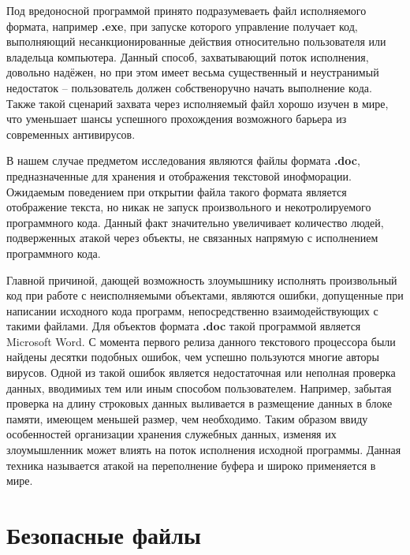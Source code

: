 Под вредоносной программой принято подразумеваеть файл исполняемого формата, например \textbf{.exe}, при запуске которого управление получает код, выполняющий несанкционированные действия относительно пользователя или владельца компьютера. 
Данный способ, захватывающий поток исполнения, довольно надёжен, но при этом имеет весьма существенный и неустранимый недостаток -- пользователь должен собственоручно начать выполнение кода.
Также такой сценарий захвата через исполняемый файл хорошо изучен в мире, что уменьшает шансы успешного прохождения возможного барьера из современных антивирусов.

В нашем случае предметом исследования являются файлы формата \textbf{.doc}, предназначенные для хранения и отображения текстовой инофморации. 
Ожидаемым поведением при открытии файла такого формата является отображение текста, но никак не запуск произвольного и некотролируемого программного кода.
Данный факт значительно увеличивает количество людей, подверженных атакой через объекты, не связанных напрямую с исполнением программного кода.

Главной причиной, дающей возможность злоумышнику исполнять произвольный код при работе с неисполняемыми объектами, являются ошибки, допущенные при написании исходного кода программ, непосредственно взаимодействующих с такими файлами. 
Для объектов формата \textbf{.doc} такой программой является Microsoft Word.
С момента первого релиза данного текстового процессора были найдены десятки подобных ошибок, чем успешно пользуются многие авторы вирусов.
Одной из такой ошибок является недостаточная или неполная проверка данных, вводимиых тем или иным способом пользователем.
Например, забытая проверка на длину строковых данных выливается в размещение данных в блоке памяти, имеющем меньшей размер, чем необходимо. 
Таким образом ввиду особенностей организации хранения служебных данных, изменяя их злоумышленник может влиять на поток исполнения исходной программы.
Данная техника называется атакой на переполнение буфера и широко применяется в мире.




\section{Безопасные файлы}